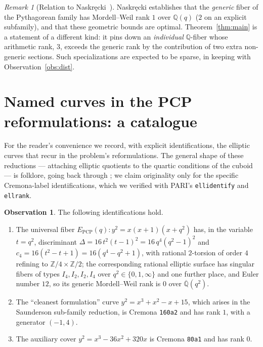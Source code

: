 \documentclass[11pt,reqno]{amsart}
\theoremstyle{plain}
\theoremstyle{definition}
\newtheorem{observation}[theorem]{Observation}
\theoremstyle{remark}
\newtheorem{remark}[theorem]{Remark}
\newcommand{\Q}{\mathbb{Q}}
\newcommand{\Z}{\mathbb{Z}}
\newcommand{\PCP}{E_{\mathrm{PCP}}}
\begin{document}
\begin{remark}[Relation to Naskr\k{e}cki~\cite{Nas}]
Naskr\k{e}cki establishes that the \emph{generic} fiber of the Pythagorean
family has Mordell--Weil rank $1$ over $\Q(q)$ ($2$ on an explicit subfamily),
and that these geometric bounds are optimal. Theorem~\ref{thm:main} is a
statement of a different kind: it pins down an \emph{individual} $\Q$-fiber
whose arithmetic rank, $3$, exceeds the generic rank by the contribution of two
extra non-generic sections. Such specializations are expected to be sparse, in
keeping with Observation~\ref{obs:dist}.
\end{remark}

\section{Named curves in the PCP reformulations: a catalogue}\label{sec:catalogue}

For the reader's convenience we record, with explicit identifications, the
elliptic curves that recur in the problem's reformulations. The general shape of
these reductions --- attaching elliptic quotients to the quartic conditions of
the cuboid --- is folklore, going back through
\cite{vanLuijk,Sharipov,Nas,Pesch1}; we claim originality only for the specific
Cremona-label identifications, which we verified with PARI's
\texttt{ellidentify} and \texttt{ellrank}.

\begin{observation}\label{obs:catalogue}
The following identifications hold.
\begin{enumerate}
  \item The universal fiber $\PCP(q)\colon y^2=x(x+1)(x+q^2)$ has, in the
        variable $t=q^2$, discriminant $\Delta = 16\,t^2(t-1)^2 = 16\,q^4(q^2-1)^2$
        and $c_4 = 16(t^2-t+1)=16(q^4-q^2+1)$, with rational $2$-torsion of
        order $4$ refining to $\Z/4\times\Z/2$; the corresponding rational
        elliptic surface has singular fibers of types
        $I_4, I_2, I_2, I_4$ over $q^2\in\{0,1,\infty\}$ and one further place,
        and Euler number $12$, so its generic Mordell--Weil rank is $0$ over
        $\overline{\Q}(q^2)$.
  \item The ``cleanest formulation'' curve $y^2=x^3+x^2-x+15$, which arises in
        the Saunderson sub-family reduction, is Cremona \texttt{160a2} and has
        rank $1$, with a generator $(-1,4)$.
  \item The auxiliary cover $y^2=x^3-36x^2+320x$ is Cremona \texttt{80a1} and
        has rank $0$.
\end{enumerate}
\end{observation}
\end{document}
